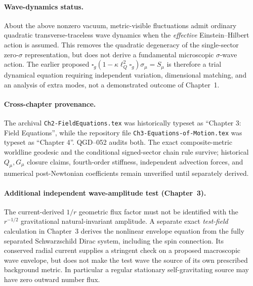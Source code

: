 \documentclass[11pt,a4paper]{article}
\begin{document}
\paragraph{Wave-dynamics status.}
About the above nonzero vacuum, metric-visible fluctuations admit ordinary
quadratic transverse-traceless wave dynamics when the \emph{effective}
Einstein--Hilbert action is assumed.  This removes the quadratic degeneracy of
the single-sector zero-$\sigma$ representation, but does not derive a
fundamental microscopic $\sigma$-wave action.  The earlier proposed
$\square_g(1-\kappa\ell_Q^2\square_g)\sigma_\mu=S_\mu$ is therefore a
trial dynamical equation requiring independent variation, dimensional matching,
and an analysis of extra modes, not a demonstrated outcome of Chapter~1.

\paragraph{Cross-chapter provenance.}
The archival \texttt{Ch2-FieldEquations.tex} was historically typeset as
``Chapter 3: Field Equations'', while the repository file
\texttt{Ch3-Equations-of-Motion.tex} was typeset as ``Chapter 4''.
QGD--052 audits both.  The exact composite-metric worldline geodesic and the
conditional signed-sector chain rule survive; historical $Q_\mu,G_\mu$ closure
claims, fourth-order stiffness, independent advection forces, and numerical
post-Newtonian coefficients remain unverified until separately derived.


\paragraph{Additional independent wave-amplitude test (Chapter~3).}
The current-derived $1/r$ geometric flux factor must not be identified with the $r^{-1/2}$ gravitational natural-invariant amplitude.  A separate exact \emph{test-field} calculation in Chapter~3 derives the nonlinear envelope equation from the fully separated Schwarzschild Dirac system, including the spin connection. Its conserved radial current supplies a stringent check on a proposed macroscopic wave envelope, but does not make the test wave the source of its own prescribed background metric.  In particular a regular stationary self-gravitating source may have zero outward number flux.
\end{document}
